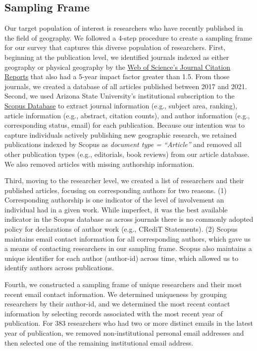 \documentclass[]{interact}
\theoremstyle{plain}%
\theoremstyle{definition}
\theoremstyle{remark}
\begin{document}
\subsection*{Sampling Frame}
Our target population of interest is researchers who have recently published in the field of geography. 
We followed a 4-step procedure to create a sampling frame for our survey that captures this diverse population of researchers. First, beginning at the publication level, we identified journals indexed as either geography or physical geography by the \href{https://access.clarivate.com/}{Web of Science's Journal Citation Reports} that also had a 5-year impact factor greater than 1.5.
From those journals, we created a database of all articles published between 2017 and 2021.  
Second, we used Arizona State University's institutional subscription to the \href{https://www.scopus.com/home.uri}{Scopus Database} to extract journal information (e.g., subject area, ranking), article information (e.g., abstract, citation counts), and author information (e.g., corresponding status, email) for each publication. 
Because our intention was to capture individuals actively publishing new geographic research, we retained publications indexed by Scopus as \textit{document type = ``Article''} and removed all other publication types (e.g., editorials, book reviews) from our article database. 
We also removed articles with missing authorship information. 

Third, moving to the researcher level, we created a list of researchers and their published articles, focusing on corresponding authors for two reasons.
(1) Corresponding authorship is one indicator of the level of involvement an individual had in a given work. 
While imperfect, it was the best available indicator in the Scopus database as across journals there is no commonly adopted policy for declarations of author work (e.g., CRediT Statements).
(2) Scopus maintains email contact information for all corresponding authors, which gave us a means of contacting researchers in our sampling frame.
Scopus also maintains a unique identifier for each author (author-id) across time, which allowed us to identify authors across publications. 

Fourth, we constructed a sampling frame of unique researchers and their most recent email contact information. 
We determined uniqueness by grouping researchers by their author-id, and we determined the most recent contact information by selecting records associated with the most recent year of publication. 
For 383 researchers who had two or more distinct emails in the latest year of publication, we removed non-institutional personal email addresses and then selected one of the remaining institutional email address.
\end{document}
